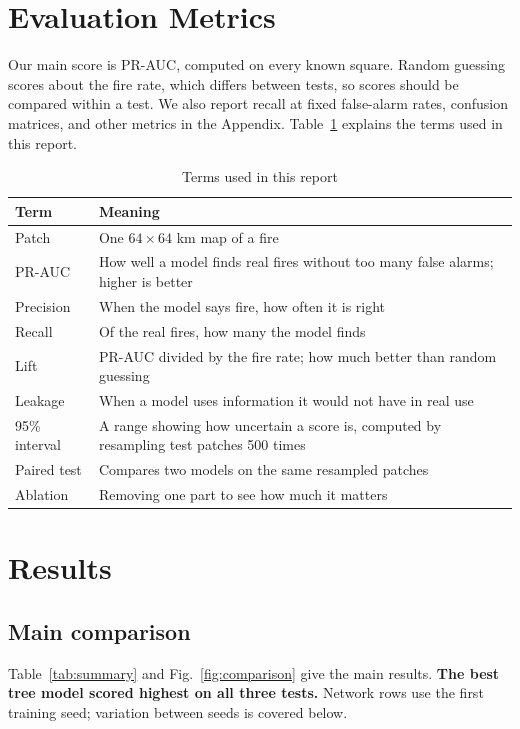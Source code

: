\documentclass[conference]{IEEEtran}
\newcommand{\fitcolumn}[1]{\adjustbox{max width=\columnwidth}{}}
\begin{document}
\begin{table}[t]
\centering
\caption{Test PR-AUC at Phase 1 and in the final re-run}
\label{tab:phase1}
\scriptsize
\fitcolumn{tables/phase1_changes.tex}
\end{table}

\section{Evaluation Metrics}
Our main score is PR-AUC, computed on every known square. Random guessing scores about the fire rate, which differs between tests, so scores should be compared within a test. We also report recall at fixed false-alarm rates, confusion matrices, and other metrics in the Appendix. Table~\ref{tab:glossary} explains the terms used in this report.

\begin{table}[t]
\centering
\caption{Terms used in this report}
\label{tab:glossary}
\footnotesize
\begin{tabular}{p{}p{}}
\toprule
Term & Meaning \\
\midrule
Patch & One $64\times64$ km map of a fire \\
PR-AUC & How well a model finds real fires without too many false alarms; higher is better \\
Precision & When the model says fire, how often it is right \\
Recall & Of the real fires, how many the model finds \\
Lift & PR-AUC divided by the fire rate; how much better than random guessing \\
Leakage & When a model uses information it would not have in real use \\
95\% interval & A range showing how uncertain a score is, computed by resampling test patches 500 times \\
Paired test & Compares two models on the same resampled patches \\
Ablation & Removing one part to see how much it matters \\
\bottomrule
\end{tabular}
\end{table}

\section{Results}
\subsection{Main comparison}
Table~\ref{tab:summary} and Fig.~\ref{fig:comparison} give the main results. \textbf{The best tree model scored highest on all three tests.} Network rows use the first training seed; variation between seeds is covered below.
\end{document}
